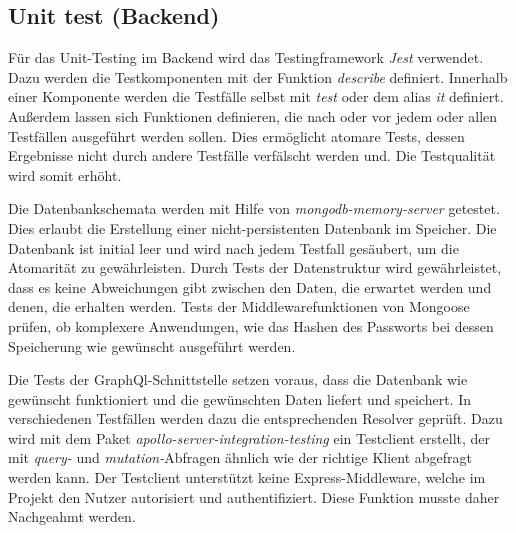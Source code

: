 
\subsection{Unit test (Backend)}
Für das Unit-Testing im Backend wird das Testingframework \textit{Jest} verwendet.
Dazu werden die Testkomponenten mit der Funktion \textit{describe} definiert.
Innerhalb einer Komponente werden die Testfälle selbst mit \textit{test} oder dem alias \textit{it} definiert.
Außerdem lassen sich Funktionen definieren, die nach oder vor jedem oder allen Testfällen ausgeführt werden sollen.
Dies ermöglicht atomare Tests, dessen Ergebnisse nicht durch andere Testfälle verfälscht werden und.
Die Testqualität wird somit erhöht.

Die Datenbankschemata werden mit Hilfe von \textit{mongodb-memory-server} getestet.
Dies erlaubt die Erstellung einer nicht-persistenten Datenbank im Speicher.
Die Datenbank ist initial leer und wird nach jedem Testfall gesäubert, um die Atomarität zu gewährleisten.
Durch Tests der Datenstruktur wird gewährleistet, dass es keine Abweichungen gibt zwischen den Daten, die erwartet werden und denen, die erhalten werden.
Tests der Middlewarefunktionen von Mongoose prüfen, ob komplexere Anwendungen, wie das Hashen des Passworts bei dessen Speicherung wie gewünscht ausgeführt werden.

Die Tests der GraphQl-Schnittstelle setzen voraus, dass die Datenbank wie gewünscht funktioniert und die gewünschten Daten liefert und speichert.
In verschiedenen Testfällen werden dazu die entsprechenden Resolver geprüft.
Dazu wird mit dem Paket \textit{apollo-server-integration-testing} ein Testclient erstellt, der mit \textit{query-} und \textit{mutation-}Abfragen ähnlich wie der richtige Klient abgefragt werden kann.
Der Testclient unterstützt keine Express-Middleware, welche im Projekt den Nutzer autorisiert und authentifiziert.
Diese Funktion musste daher Nachgeahmt werden. 


